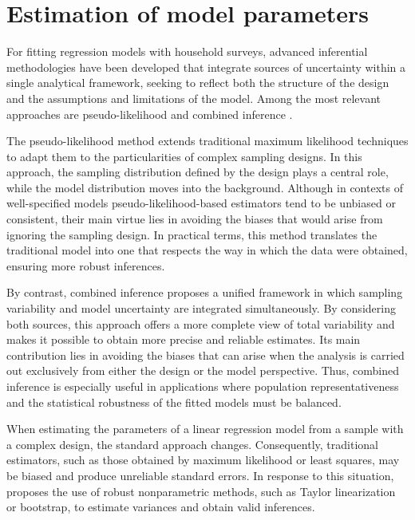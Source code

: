 \documentclass[
  english,
  12pt,
]{book}
\begin{document}
\section{Estimation of model parameters}\label{estimacion-de-los-parametros-del-modelo}

For fitting regression models with household surveys, advanced inferential methodologies have been developed that integrate sources of uncertainty within a single analytical framework, seeking to reflect both the structure of the design and the assumptions and limitations of the model. Among the most relevant approaches are pseudo-likelihood \citep{molina1992pseudo} and combined inference \citep{binder2011estimating}.

The pseudo-likelihood method extends traditional maximum likelihood techniques to adapt them to the particularities of complex sampling designs. In this approach, the sampling distribution defined by the design plays a central role, while the model distribution moves into the background. Although in contexts of well-specified models pseudo-likelihood-based estimators tend to be unbiased or consistent, their main virtue lies in avoiding the biases that would arise from ignoring the sampling design. In practical terms, this method translates the traditional model into one that respects the way in which the data were obtained, ensuring more robust inferences.

By contrast, combined inference proposes a unified framework in which sampling variability and model uncertainty are integrated simultaneously. By considering both sources, this approach offers a more complete view of total variability and makes it possible to obtain more precise and reliable estimates. Its main contribution lies in avoiding the biases that can arise when the analysis is carried out exclusively from either the design or the model perspective. Thus, combined inference is especially useful in applications where population representativeness and the statistical robustness of the fitted models must be balanced.

When estimating the parameters of a linear regression model from a sample with a complex design, the standard approach changes. Consequently, traditional estimators, such as those obtained by maximum likelihood or least squares, may be biased and produce unreliable standard errors. In response to this situation, \citet{wolter2007} proposes the use of robust nonparametric methods, such as Taylor linearization or bootstrap, to estimate variances and obtain valid inferences.
\end{document}
